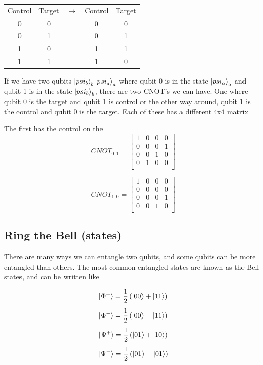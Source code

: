 \begin{center}
\begin{tabular}{ | c | c | c | c | c |}

 Control & Target & $\rightarrow{}$ & Control & Target \\ 
  
 0 & 0 &  & 0 & 0 \\ 
 
 0 & 1 &  & 0 & 1 \\
 
 1 & 0 &  & 1 & 1 \\
 
 1 & 1 &  & 1 & 0 \\

  
\end{tabular}
\end{center}

If we have two qubits $\ket{psi_b}_b\ket{psi_a}_a$ where qubit 0 is in the state $\ket{psi_a}_a$ and qubit 1 is in the state $\ket{psi_b}_b$, there are two CNOT's we can have. One where qubit 0 is the target and qubit 1 is control or the other way around, qubit 1 is the control and qubit 0 is the target. Each of these has a different 4x4 matrix

The first has the control on the 
$$
CNOT_{0, 1} = \begin{bmatrix} 1 & 0 & 0 & 0 \\
0 & 0 & 0 & 1 \\
0 & 0 & 1 & 0 \\
0 & 1 & 0 & 0 \\
\end{bmatrix}
$$

$$
CNOT_{1, 0} = \begin{bmatrix} 1 & 0 & 0 & 0 \\
0 & 0 & 0 & 0 \\
0 & 0 & 0 & 1 \\
0 & 0 & 1 & 0 \\
\end{bmatrix}
$$

\subsection{ Ring the Bell (states)}

There are many ways we can entangle two qubits, and some qubits can be more entangled than others. The most common entangled states are known as the Bell states, and can be written like

$$ \ket{\Phi^+} = \frac{1}{2} \left( \ket{00} + \ket{11} \right) $$
$$ \ket{\Phi^-} = \frac{1}{2} \left( \ket{00} - \ket{11} \right) $$
$$ \ket{\Psi^+} = \frac{1}{2} \left( \ket{01} + \ket{10} \right) $$
$$ \ket{\Psi^-} = \frac{1}{2} \left( \ket{01} - \ket{01} \right) $$

